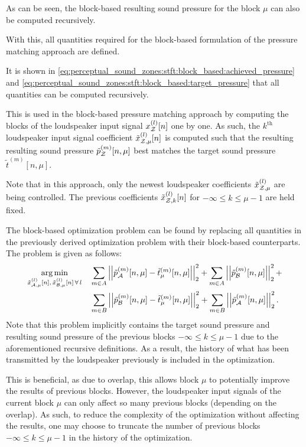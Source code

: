 \begin{itemize}
        As can be seen, the block-based resulting sound pressure for the block $\mu$ can also be computed recursively.
\end{itemize}

With this, all quantities required for the block-based formulation of the pressure matching approach are defined.

It is shown in \autoref{eq:perceptual_sound_zones:stft:block_based:achieved_pressure} and \autoref{eq:perceptual_sound_zones:stft:block_based:target_pressure} that all quantities can be computed recursively.

This is used in the block-based pressure matching approach by computing the blocks of the loudspeaker input signal $x_{\mathcal{Z}}^{(l)}[n]$ one by one. 
As such, the $k^\text{th}$ loudspeaker input signal coefficient $\tilde{x}^{(l)}_{\mathcal{Z},\mu}[n]$ is computed such that the resulting resulting sound pressure $\tilde{p}_{\mathcal{Z}}^{(m)}[n, \mu]$ best matches the target sound pressure $\tilde{t}^{(m)}[n, \mu]$. 

Note that in this approach, only the newest loudspeaker coefficients $\tilde{x}^{(l)}_{\mathcal{Z},\mu}$ are being controlled. 
The previous coefficients $\tilde{x}^{(l)}_{\mathcal{Z},k}[n]$ for $-\infty \leq k \leq \mu - 1$ are held fixed.

The block-based optimization problem can be found by replacing all quantities in the previously derived optimization problem with their block-based counterparts.
The problem is given as follows:
\begin{align}
    \begin{aligned}
        \argmin{\tilde{x}_{\za,\mu}^{(l)}[n],\,\tilde{x}_{\zb,\mu}^{(l)}[n]\,\forall\,l}{
           &\sum_{m\in A} \norm[2][2]{\tilde{p}_{\za}^{(m)}[n,\mu] - \tilde{t}_\mu^{(m)}[n,\mu]} +
           \sum_{m\in A} \norm[2][2]{\tilde{p}_{\zb}^{(m)}[n,\mu]} + \\
           &\sum_{m\in B} \norm[2][2]{\tilde{p}_{\zb}^{(m)}[n,\mu] - \tilde{t}_\mu^{(m)}[n,\mu]} + 
           \sum_{m\in B} \norm[2][2]{\tilde{p}_{\za}^{(m)}[n,\mu]}
        }.
    \end{aligned}
\end{align}
Note that this problem implicitly contains the target sound pressure and resulting sound pressure of the previous blocks $-\infty \leq k \leq \mu - 1$ due to the aforementioned recursive definitions.
As a result, the history of what has been transmitted by the loudspeaker previously is included in the optimization.

This is beneficial, as due to overlap, this allows block $\mu$ to potentially improve the results of previous blocks.
However, the loudspeaker input signals of the current block $\mu$ can only affect so many previous blocks (depending on the overlap).
As such, to reduce the complexity of the optimization without affecting the results, one may choose to truncate the number of previous blocks $-\infty \leq k \leq \mu - 1$ in the history of the optimization.

